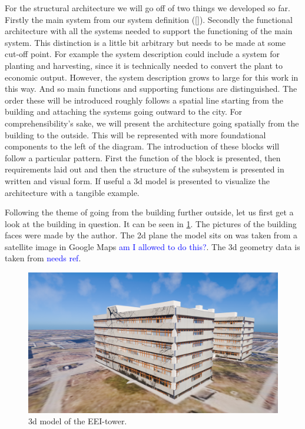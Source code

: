 For the structural architecture we will go off of two things we developed so far.
Firstly the main system from our system definition (\ref{}).
Secondly the functional architecture with all the systems needed to support the functioning of the main system.
This distinction is a little bit arbitrary but needs to be made at some cut-off point.
For example the system description could include a system for planting and harvesting, since it is technically needed to convert the plant to economic output.
However, the system description grows to large for this work in this way.
And so main functions and supporting functions are distinguished.
The order these will be introduced roughly follows a spatial line starting from the building and attaching the systems going outward to the city.
For comprehensibility’s sake, we will present the architecture going spatially from the building to the outside.
This will be represented with more foundational components to the left of the diagram.
The introduction of these blocks will follow a particular pattern.
First the function of the block is presented, then requirements laid out and then the structure of the subsystem is presented in written and visual form.
If useful a 3d model is presented to visualize the architecture with a tangible example.

Following the theme of going from the building further outside, let us first get a look at the building in question.
It can be seen in \ref{fig:3d-building}.
The pictures of the building faces were made by the author.
The 2d plane the model sits on was taken from a satellite image in Google Maps \textcolor{Blue}{am I allowed to do this?}.
The 3d geometry data is taken from \textcolor{Blue}{needs ref}.
\begin{figure}[htbp]
  \centering
  \caption{3d model of the EEI-tower.}
  \label{fig:3d-building}
  \includegraphics[width=\textwidth]{img/3d_model/building.png}
\end{figure}

